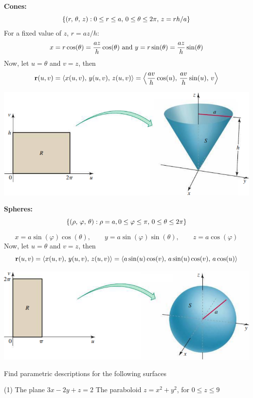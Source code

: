 \documentclass[mathNotesPreamble]{subfiles}
\begin{document}
  \textbf{Cones:}
  \[{\left\{(r,\,\theta,\,z): 0\leq r\leq a,\, 0\leq\theta\leq 2\pi,\, z=rh/a\right\}}\]
  For a fixed value of $z$, $r=az/h$:
    \[x=r\cos(\theta)=\frac{az}{h}\cos(\theta) \textnormal{ and } y=r\sin(\theta)=\frac{az}{h}\sin(\theta)\]
  Now, let $u=\theta$ and $v=z$, then
    \[{\mathbf{r}}(u,v)={\left\langle x(u,v),\,y(u,v),\,z(u,v) \right\rangle}={\left\langle \frac{av}{h}\cos(u),\,\frac{av}{h}\sin(u),\,v \right\rangle}\]
  \begin{center}
    \includegraphics[width=0.7\linewidth]{images/briggs_17_06/fig17_45}
  \end{center}
  \pagebreak

  \textbf{Spheres:}
  \[{\left\{(\rho,\,\varphi,\,\theta): \rho=a, 0\leq \varphi\leq \pi,\, 0\leq\theta\leq 2\pi\right\}}\]

  \[x=a\sin(\varphi)\cos(\theta), \qquad y=a\sin(\varphi)\sin(\theta), \qquad z=a\cos(\varphi)\]
  Now, let $u=\theta$ and $v=z$, then
    \[{\mathbf{r}}(u,v)={\left\langle x(u,v),\,y(u,v),\,z(u,v) \right\rangle}={\left\langle a\sin(u)\cos(v),\,a\sin(u)\cos(v),\,a\cos(u) \right\rangle}\]
  \begin{center}
    \includegraphics[width=0.7\linewidth]{images/briggs_17_06/fig17_46}
  \end{center}
  \vspace*{0.5\baselineskip}

  \begin{ex*}
    Find parametric descriptions for the following surfaces
  \end{ex*}
  \begin{tasks}[after-item-skip=\stretch{1}, label=](1)
    \task The plane $3x-2y+z=2$
    \task The paraboloid $z=x^2+y^2$, for $0\leq z\leq 9$
  \end{tasks}
  \pagebreak
\end{document}
